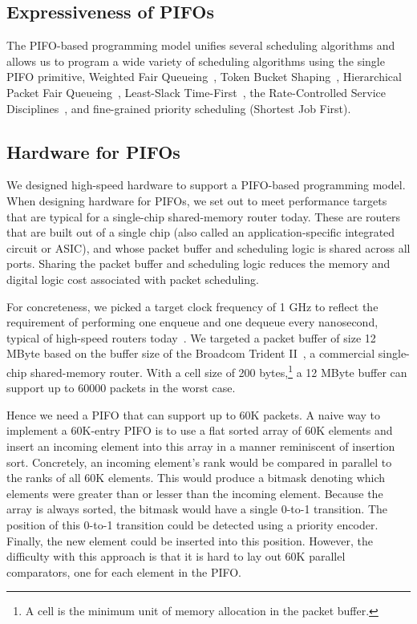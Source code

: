 \subsection{Expressiveness of PIFOs}

The PIFO-based programming model unifies several scheduling algorithms and
allows us to program a wide variety of scheduling algorithms using the single
PIFO primitive, \eg Weighted Fair Queueing~\cite{wfq}, Token Bucket
Shaping~\cite{tbf}, Hierarchical Packet Fair Queueing~\cite{hpfq}, Least-Slack
Time-First~\cite{lstf}, the Rate-Controlled Service Disciplines~\cite{rcsd},
and fine-grained priority scheduling (\eg Shortest Job First).

\subsection{Hardware for PIFOs}
\label{ss:intro_pifo_hardware}

We designed high-speed hardware to support a PIFO-based programming model. When
designing hardware for PIFOs, we set out to meet performance targets that are
typical for a single-chip shared-memory router today. These are routers that
are built out of a single chip (also called an application-specific integrated
circuit or ASIC), and whose packet buffer and scheduling logic is shared across
all ports. Sharing the packet buffer and scheduling logic reduces the memory
and digital logic cost associated with packet scheduling.

For concreteness, we picked a target clock frequency of 1 GHz to reflect the
requirement of performing one enqueue and one dequeue every nanosecond, typical
of high-speed routers today~\cite{rmt}. We targeted a packet buffer of size 12
MByte based on the buffer size of the Broadcom Trident II~\cite{bcom_buffer}, a
commercial single-chip shared-memory router. With a cell size of 200
bytes,\footnote{A cell is the minimum unit of memory allocation in the packet
buffer.} a 12 MByte buffer can support up to 60000 packets in the worst case.

Hence we need a PIFO that can support up to 60K packets. A naive way to
implement a 60K-entry PIFO is to use a flat sorted array of 60K elements and
insert an incoming element into this array in a manner reminiscent of insertion
sort. Concretely, an incoming element's rank would be compared in parallel to
the ranks of all 60K elements. This would produce a bitmask denoting which
elements were greater than or lesser than the incoming element.  Because the
array is always sorted, the bitmask would have a single 0-to-1 transition.  The
position of this 0-to-1 transition could be detected using a priority encoder.
Finally, the new element could be inserted into this position.  However, the
difficulty with this approach is that it is hard to lay out 60K parallel
comparators, one for each element in the PIFO.

